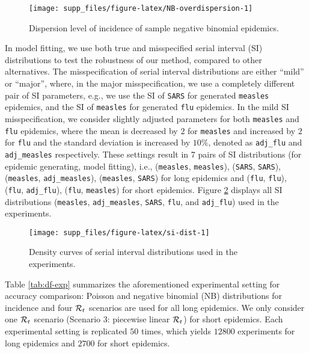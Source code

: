 \documentclass[
]{article}
\begin{document}
\begin{figure}[!ht]

{\centering \texttt{[image: supp\_files/figure-latex/NB-overdispersion-1]} 

}

\caption{Dispersion level of incidence of sample negative binomial epidemics.}\label{fig:NB-overdispersion}
\end{figure}

In model fitting, we use both true and misspecified serial interval (SI)
distributions to test the robustness of our method, compared to other alternatives.
The misspecification of serial interval distributions are either
``mild'' or ``major'', where, in the major misspecification, we use a completely different
pair of SI parameters, e.g., we use the SI of \texttt{SARS} for generated \texttt{measles} epidemics,
and the SI of \texttt{measles} for generated \texttt{flu} epidemics. In the mild SI
misspecification, we consider slightly adjusted parameters for both \texttt{measles} and
\texttt{flu} epidemics, where the mean is decreased by \(2\) for \texttt{measles} and increased by \(2\)
for \texttt{flu} and the standard deviation is increased by \(10\%\), denoted as \texttt{adj\_flu} and
\texttt{adj\_measles} respectively. These settings result in 7 pairs of SI distributions
(for epidemic generating, model fitting), i.e., (\texttt{measles}, \texttt{measles}), (\texttt{SARS}, \texttt{SARS}),
(\texttt{measles}, \texttt{adj\_measles}), (\texttt{measles}, \texttt{SARS}) for long epidemics and (\texttt{flu}, \texttt{flu}),
(\texttt{flu}, \texttt{adj\_flu}), (\texttt{flu}, \texttt{measles}) for short epidemics. Figure \ref{fig:si-dist}
displays all SI distributions (\texttt{measles}, \texttt{adj\_measles}, \texttt{SARS}, \texttt{flu}, and \texttt{adj\_flu}) used in
the experiments.

\begin{figure}[!ht]

{\centering \texttt{[image: supp\_files/figure-latex/si-dist-1]} 

}

\caption{Density curves of serial interval distributions used in the experiments.}\label{fig:si-dist}
\end{figure}

Table \ref{tab:df-exp} summarizes the aforementioned experimental setting for
accuracy comparison: Poisson and negative binomial (NB) distributions for
incidence and four \(\mathcal{R}_t\) scenarios are used for all long epidemics. We only
consider one \(\mathcal{R}_t\) scenario (Scenario 3: piecewise linear \(\mathcal{R}_t\)) for
short epidemics. Each experimental setting is replicated \(50\) times, which
yields \(12800\) experiments for long epidemics and \(2700\) for short epidemics.
\end{document}
